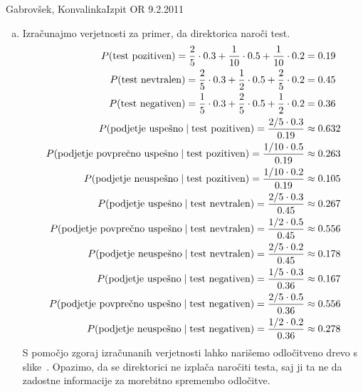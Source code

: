 \begin{naloga}{Gabrovšek, Konvalinka}{Izpit OR 9.2.2011}
\begin{odgovor}
\begin{enumerate}[(a)]
Izračunajmo še EVPI.
Tukaj upoštevamo, da posojilo odobrimo, če bo to prineslo dobiček.
$$
\EVPI = 0.3 \cdot 20\,000 € + 0.5 \cdot 10\,000 € + 0.2 \cdot 0 € = 11\,000 €
$$

\item Izračunajmo verjetnosti za primer,
da direktorica naroči test.
\begin{align*}
P(\text{test pozitiven}) =
{2 \over 5} \cdot 0.3 + {1 \over 10} \cdot 0.5 + {1 \over 10} \cdot 0.2
&= 0.19 \\
P(\text{test nevtralen}) =
{2 \over 5} \cdot 0.3 + {1 \over 2} \cdot 0.5 + {2 \over 5} \cdot 0.2
&= 0.45 \\
P(\text{test negativen}) =
{1 \over 5} \cdot 0.3 + {2 \over 5} \cdot 0.5 + {1 \over 2} \cdot 0.2
&= 0.36 \\
P(\text{podjetje uspešno} \mid \text{test pozitiven}) =
{2/5 \cdot 0.3 \over 0.19} &\approx 0.632 \\
P(\text{podjetje povprečno uspešno} \mid \text{test pozitiven}) =
{1/10 \cdot 0.5 \over 0.19} &\approx 0.263 \\
P(\text{podjetje neuspešno} \mid \text{test pozitiven}) =
{1/10 \cdot 0.2 \over 0.19} &\approx 0.105 \\
P(\text{podjetje uspešno} \mid \text{test nevtralen}) =
{2/5 \cdot 0.3 \over 0.45} &\approx 0.267 \\
P(\text{podjetje povprečno uspešno} \mid \text{test nevtralen}) =
{1/2 \cdot 0.5 \over 0.45} &\approx 0.556 \\
P(\text{podjetje neuspešno} \mid \text{test nevtralen}) =
{2/5 \cdot 0.2 \over 0.45} &\approx 0.178 \\
P(\text{podjetje uspešno} \mid \text{test negativen}) =
{1/5 \cdot 0.3 \over 0.36} &\approx 0.167 \\
P(\text{podjetje povprečno uspešno} \mid \text{test negativen}) =
{2/5 \cdot 0.5 \over 0.36} &\approx 0.556 \\
P(\text{podjetje neuspešno} \mid \text{test negativen}) =
{1/2 \cdot 0.2 \over 0.36} &\approx 0.278
\end{align*}
S pomočjo zgoraj izračunanih verjetnosti
lahko narišemo odločitveno drevo s slike~\fig.
Opazimo, da se direktorici ne izplača naročiti testa,
saj ji ta ne da zadostne informacije za morebitno spremembo odločitve.
\end{enumerate}
%
\begin{slika}
\makebox[\textwidth][c]{
\pgfslika
}
\end{slika}
\end{odgovor}
\end{naloga}
